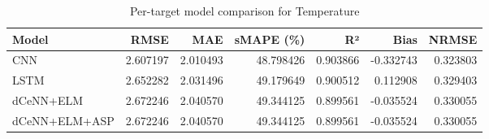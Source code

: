 \begin{table}
\caption{Per-target model comparison for Temperature}
\begin{tabular}{lrrrrrr}
\toprule
Model & RMSE & MAE & sMAPE (\%) & R² & Bias & NRMSE \\
\midrule
CNN & 2.607197 & 2.010493 & 48.798426 & 0.903866 & -0.332743 & 0.323803 \\
LSTM & 2.652282 & 2.031496 & 49.179649 & 0.900512 & 0.112908 & 0.329403 \\
dCeNN+ELM & 2.672246 & 2.040570 & 49.344125 & 0.899561 & -0.035524 & 0.330055 \\
dCeNN+ELM+ASP & 2.672246 & 2.040570 & 49.344125 & 0.899561 & -0.035524 & 0.330055 \\
\bottomrule
\end{tabular}
\end{table}
